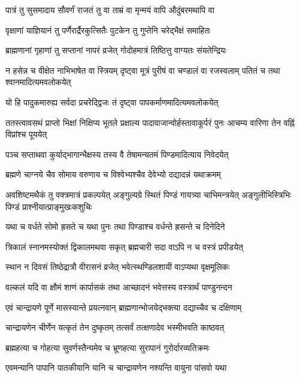 \threelineshloka
{पात्रं तु सुसमादाय सौवर्णं राजतं तु वा}
{ताम्रं वा मृन्मयं वापि औदुंबरमथापि वा}
{}


\twolineshloka
{वृक्षाणां याज्ञियानं तु पर्णैरार्द्रैरकुत्सितैः}
{पुटकेन तु गुप्तेनि चरेद्भैक्षं समाहितः}


\twolineshloka
{ब्राह्मणानां गृहाणां तु सप्तानां नापरं व्रजेत्}
{गोदोहमात्रं तिष्ठित्तु वाग्यतः संयतेन्द्रियः}


न हसेन्न च वीक्षेत नाभिभाषेत वा स्त्रियम्
\twolineshloka
{दृष्ट्वा मूत्रं पुरीषं वा चण्डालं वा रजस्वलाम्}
{पतितं च तथा श्वानमादित्यमवलोकयेत्}


\twolineshloka
{यो हि पादुकमारुह्य सर्वदा प्रचरेद्द्विजः}
{तं दृष्ट्वा पापकर्माणमादित्यमवलोकयेत्}


\threelineshloka
{ततस्त्वावसथं प्राप्तो भिक्षां निक्षिप्य भूतले}
{प्रक्षाल्य पादावाजान्वोर्हस्तावाकूर्परं पुनः}
{आचम्य वारिणा तेन वह्निं विप्रांश्च पूययेत्}


\twolineshloka
{पञ्च सप्ताथवा कुर्याद्भागान्भैक्षस्य तस्य वै}
{तेषामन्यतमं पिण्डमादित्याय निवेदयेत्}


\twolineshloka
{ब्रह्मणे चाग्नये चैव सोमाय वरुणाय च}
{विश्वेभ्यश्चैव देवेभ्यो दद्यादन्नं यथाक्रमम्}


अवशिष्टमथैकं तु वक्त्रमात्रं प्रकल्पयेत्
\threelineshloka
{अङ्गुल्यग्रे स्थितं पिण्डं गायत्र्या चाभिमन्त्रयेत्}
{अङ्गुलीभिस्त्रिभिः पिण्डं प्राश्नीयात्प्राङ्मुखःकशुचिः}
{}


\twolineshloka
{यथा च वर्धते सोमो ह्रसते च यथा पुनः}
{तथा पिण्डाश्च वर्धन्ते ह्रसन्ते च दिनेदिने}


\twolineshloka
{त्रिकालं स्नानमस्योक्तं द्विकालमथवा सकृत्}
{ब्रह्मचारी सदा वाऽपि न च वस्त्रं प्रपीडयेत्}


\twolineshloka
{स्थान न दिवसं तिष्ठेद्रात्रौ वीरासनं व्रजेत्}
{भवेत्स्थण्डिलशायी वाऽप्यथा वृक्षमूलिकः}


\twolineshloka
{वल्कलं यदि वा क्षौमं शाणं कार्पासकं तथा}
{आच्छादनं भवेत्तस्य वस्त्रार्थं पाण्डुनन्दन}


\twolineshloka
{एवं चान्द्रायणे पूर्णे मासस्यान्ते प्रयत्नवान्}
{ब्राह्मणान्भोजयेद्भक्त्या दद्याच्चैव च दक्षिणाम्}


\twolineshloka
{चान्द्रायणेन चीर्णेन यत्कृतं तेन दुष्कृतम्}
{तत्सर्वं तत्क्षणादेव भस्मीभवति काष्ठवत्}


\twolineshloka
{ब्रह्महत्या च गोहत्या सुवर्णस्तैन्यमेव च}
{भ्रूणहत्या सुरापानं गुरोर्दारव्यतिक्रमः}


\twolineshloka
{एवमन्यानि पापानि पातकीयानि यानि च}
{चान्द्रायणेन नश्यन्ति वायुना पांसवो यथा}



